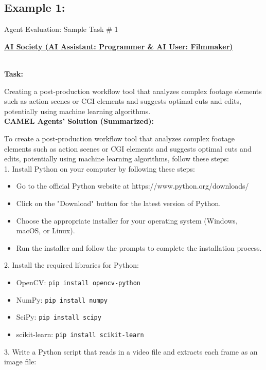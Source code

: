 \subsection{Example 1:}
\begin{AIBoxBreak}{Agent Evaluation: Sample Task \# 1}
	\parbox[t]{\textwidth}{{\bf \underline{AI Society (AI Assistant: Programmer \& AI User: Filmmaker)}}}\\


	\textbf{Task:}

	Creating a post-production workflow tool that analyzes complex footage elements such as action scenes or CGI elements and suggests optimal cuts and edits, potentially using machine learning algorithms. \\

	\textbf{CAMEL Agents' Solution (Summarized):}


	To create a post-production workflow tool that analyzes complex footage elements such as action scenes or CGI elements and suggests optimal cuts and edits, potentially using machine learning algorithms, follow these steps: \\

	1. Install Python on your computer by following these steps:
	\begin{itemize}
		\item Go to the official Python website at https://www.python.org/downloads/
		\item Click on the "Download" button for the latest version of Python.
		\item Choose the appropriate installer for your operating system (Windows, macOS, or Linux).
		\item Run the installer and follow the prompts to complete the installation process.
	\end{itemize}

	2. Install the required libraries for Python:
	\begin{itemize}
		\item OpenCV: \texttt{pip install opencv-python}
		\item NumPy: \texttt{pip install numpy}
		\item SciPy: \texttt{pip install scipy}
		\item scikit-learn: \texttt{pip install scikit-learn}
	\end{itemize}


	3. Write a Python script that reads in a video file and extracts each frame as an image file:


\end{AIBoxBreak}

